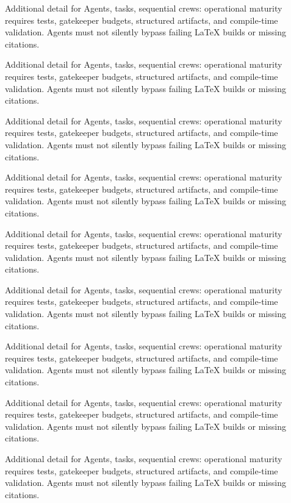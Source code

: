 Additional detail for Agents, tasks, sequential crews: operational maturity requires tests, gatekeeper budgets, structured artifacts, and compile-time validation. Agents must not silently bypass failing LaTeX builds or missing citations. \cite{crewai2024} \cite{langgraph2024}

Additional detail for Agents, tasks, sequential crews: operational maturity requires tests, gatekeeper budgets, structured artifacts, and compile-time validation. Agents must not silently bypass failing LaTeX builds or missing citations. \cite{crewai2024} \cite{langgraph2024}

Additional detail for Agents, tasks, sequential crews: operational maturity requires tests, gatekeeper budgets, structured artifacts, and compile-time validation. Agents must not silently bypass failing LaTeX builds or missing citations. \cite{crewai2024} \cite{langgraph2024}

Additional detail for Agents, tasks, sequential crews: operational maturity requires tests, gatekeeper budgets, structured artifacts, and compile-time validation. Agents must not silently bypass failing LaTeX builds or missing citations. \cite{crewai2024} \cite{langgraph2024}

Additional detail for Agents, tasks, sequential crews: operational maturity requires tests, gatekeeper budgets, structured artifacts, and compile-time validation. Agents must not silently bypass failing LaTeX builds or missing citations. \cite{crewai2024} \cite{langgraph2024}

Additional detail for Agents, tasks, sequential crews: operational maturity requires tests, gatekeeper budgets, structured artifacts, and compile-time validation. Agents must not silently bypass failing LaTeX builds or missing citations. \cite{crewai2024} \cite{langgraph2024}

Additional detail for Agents, tasks, sequential crews: operational maturity requires tests, gatekeeper budgets, structured artifacts, and compile-time validation. Agents must not silently bypass failing LaTeX builds or missing citations. \cite{crewai2024} \cite{langgraph2024}

Additional detail for Agents, tasks, sequential crews: operational maturity requires tests, gatekeeper budgets, structured artifacts, and compile-time validation. Agents must not silently bypass failing LaTeX builds or missing citations. \cite{crewai2024} \cite{langgraph2024}

Additional detail for Agents, tasks, sequential crews: operational maturity requires tests, gatekeeper budgets, structured artifacts, and compile-time validation. Agents must not silently bypass failing LaTeX builds or missing citations. \cite{crewai2024} \cite{langgraph2024}

